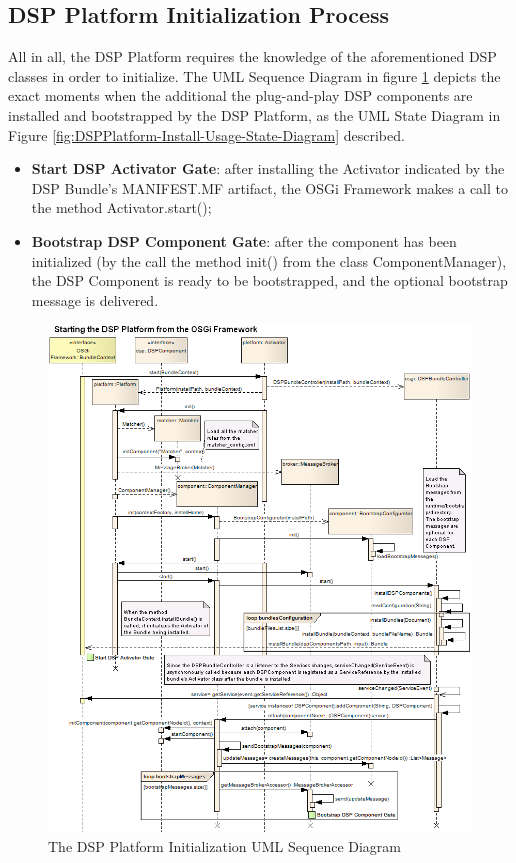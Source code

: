 \subsection{DSP Platform Initialization Process}

All in all, the DSP Platform requires the knowledge of the aforementioned DSP
classes in order to initialize. The UML Sequence Diagram \cite{uml} in figure
\ref{fig:From-OSGi-DSP-Platform-Start-to-All-Components-Sequence-Diagram}
depicts the exact moments when the additional the plug-and-play DSP components
are installed and bootstrapped by the DSP Platform, as the UML State Diagram
\cite{uml} in Figure \ref{fig:DSPPlatform-Install-Usage-State-Diagram}
described.

\begin{itemize}
  \item \textbf{Start DSP Activator Gate}: after installing the Activator
  indicated by the DSP Bundle's MANIFEST.MF artifact, the OSGi Framework makes
  a call to the method Activator.start();
  \item \textbf{Bootstrap DSP Component Gate}: after the component has been
  initialized (by the call the method init() from the class ComponentManager),
  the DSP Component is ready to be bootstrapped, and the optional bootstrap
  message is delivered.
\end{itemize}

\begin{figure}[!b]
  \centering
  \includegraphics[scale=0.5]{../diagrams/From-OSGi-DSP-Platform-Start-to-All-Components-Sequence-Diagram}
  \caption{The DSP Platform Initialization UML Sequence Diagram}
  \label{fig:From-OSGi-DSP-Platform-Start-to-All-Components-Sequence-Diagram}
\end{figure}


